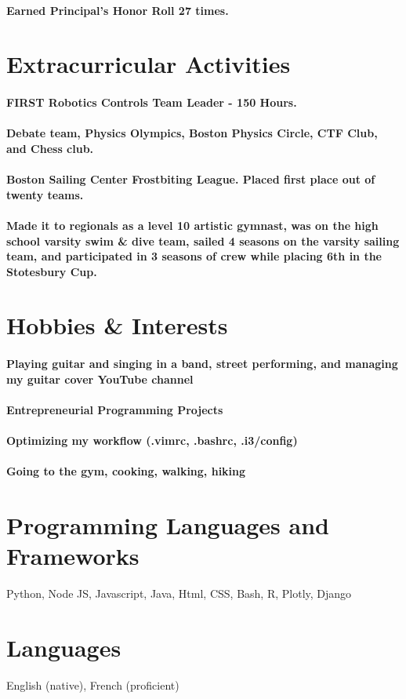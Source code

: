 \documentclass{article}
\begin{document}
\paragraph{Earned Principal's Honor Roll 27 times.}

\section{Extracurricular Activities}

\paragraph{FIRST Robotics Controls Team Leader - 150 Hours.}

\paragraph{Debate team, Physics Olympics, Boston Physics Circle, CTF Club, and Chess club.}
\paragraph{Boston Sailing Center Frostbiting League. Placed first place out of twenty teams.}
\paragraph{Made it to regionals as a level 10 artistic gymnast, was on the high school varsity swim \& dive team, sailed 4 seasons on the varsity sailing team, and participated in 3 seasons of crew while placing 6th in the Stotesbury Cup.}


\section{Hobbies \& Interests}

\paragraph{Playing guitar and singing in a band, street performing, and managing my guitar cover YouTube channel}

\paragraph{Entrepreneurial Programming Projects}

\paragraph{Optimizing my workflow (.vimrc, .bashrc, .i3/config)}

\paragraph{Going to the gym, cooking, walking, hiking}



\section{Programming Languages and Frameworks}

Python, Node JS, Javascript, Java, Html, CSS, Bash, R, Plotly, Django

\section{Languages}

English (native), French (proficient)
\end{document}
